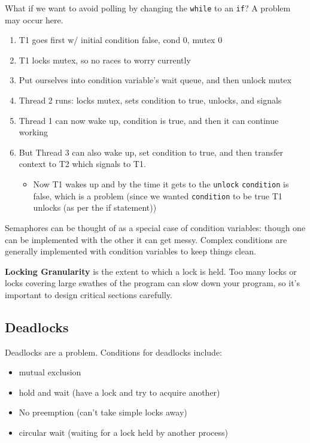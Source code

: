 \documentclass[../notes.tex]{subfiles}
\begin{document}
What if we want to avoid polling by changing the \texttt{while} to an \texttt{if}? A problem may occur here.

\begin{enumerate}
    \item T1 goes first w/ initial condition false, cond 0, mutex 0
    \item T1 locks mutex, so no races to worry currently
    \item Put ourselves into condition variable's wait queue, and then unlock mutex
    \item Thread 2 runs: locks mutex, sets condition to true, unlocks, and signals
    \item Thread 1 can now wake up, condition is true, and then it can continue working
    \item But Thread 3 can also wake up, set condition to true, and then transfer context to T2 which signals to T1.
        \begin{itemize}
            \item Now T1 wakes up and by the time it gets to the \texttt{unlock} \texttt{condition} is false, which is a problem (since we wanted \texttt{condition} to be true T1 unlocks (as per the if statement))
        \end{itemize}
\end{enumerate}






Semaphores can be thought of as a special case of condition variables: though one can be implemented with the other it can get messy. Complex conditions are generally implemented with condition variables to keep things clean.

\begin{definition}
    \textbf{Locking Granularity} is the extent to which a lock is held. Too many locks or locks covering large swathes of the program can slow down your program, so it's important to design critical sections carefully. 
\end{definition}


\subsection{Deadlocks}
Deadlocks are a problem. Conditions for deadlocks include:

\begin{itemize}
    \item mutual exclusion
    \item hold and wait (have a lock and try to acquire another)
    \item No preemption (can't take simple locks away)
    \item circular wait (waiting for a lock held by another process)
\end{itemize}
\end{document}
